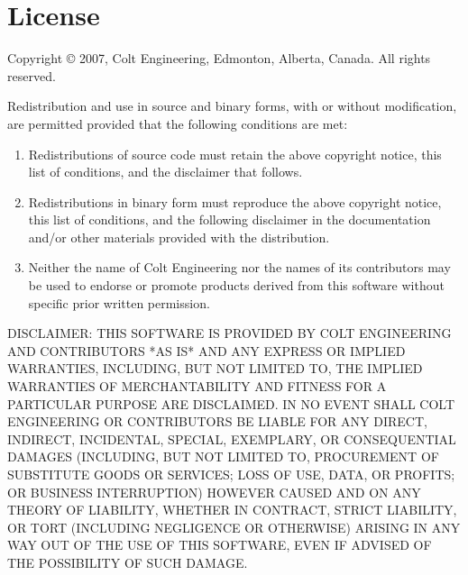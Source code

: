 \chapter{License}

\centerline{}

Copyright \copyright{} 2007, Colt Engineering, Edmonton, Alberta, Canada.
All rights reserved.

Redistribution and use in source and binary forms, with or without
modification, are permitted provided that the following conditions are met:

\begin{enumerate}
\item
    Redistributions of source code must retain the above copyright notice,
    this list of conditions, and the disclaimer that follows.

\item
    Redistributions in binary form must reproduce the above copyright
    notice, this list of conditions, and the following disclaimer in the
    documentation and/or other materials provided with the distribution.

\item
    Neither the name of Colt Engineering nor the names of its contributors may
    be used to endorse or promote products derived from this software
    without specific prior written permission.
\end{enumerate}

DISCLAIMER:
THIS SOFTWARE IS PROVIDED BY COLT ENGINEERING AND CONTRIBUTORS *AS IS*
AND ANY EXPRESS OR IMPLIED WARRANTIES, INCLUDING, BUT NOT LIMITED TO,
THE IMPLIED WARRANTIES OF MERCHANTABILITY AND FITNESS FOR A
PARTICULAR PURPOSE ARE DISCLAIMED. IN NO EVENT SHALL COLT ENGINEERING
OR CONTRIBUTORS BE LIABLE FOR ANY DIRECT, INDIRECT, INCIDENTAL,
SPECIAL, EXEMPLARY, OR CONSEQUENTIAL DAMAGES (INCLUDING, BUT NOT
LIMITED TO, PROCUREMENT OF SUBSTITUTE GOODS OR SERVICES; LOSS OF
USE, DATA, OR PROFITS; OR BUSINESS INTERRUPTION) HOWEVER CAUSED
AND ON ANY THEORY OF LIABILITY, WHETHER IN CONTRACT, STRICT LIABILITY,
OR TORT (INCLUDING NEGLIGENCE OR OTHERWISE) ARISING IN ANY WAY OUT
OF THE USE OF THIS SOFTWARE, EVEN IF ADVISED OF THE POSSIBILITY OF
SUCH DAMAGE.

